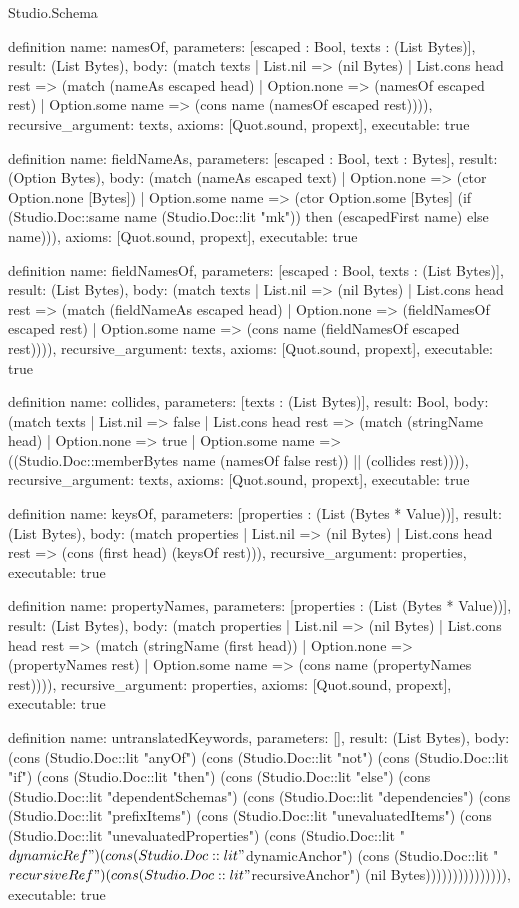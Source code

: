 \begin{lexlean}{Studio.Schema}
\begin{semanticmodule}
definition{
  name: namesOf,
  parameters: [escaped : Bool, texts : (List Bytes)],
  result: (List Bytes),
  body: (match texts
    | List.nil => (nil Bytes)
    | List.cons head rest => (match (nameAs escaped head)
      | Option.none => (namesOf escaped rest)
      | Option.some name => (cons name (namesOf escaped rest)))),
  recursive_argument: texts,
  axioms: [Quot.sound, propext],
  executable: true
}

definition{
  name: fieldNameAs,
  parameters: [escaped : Bool, text : Bytes],
  result: (Option Bytes),
  body: (match (nameAs escaped text)
    | Option.none => (ctor Option.none [Bytes])
    | Option.some name => (ctor Option.some [Bytes] (if (Studio.Doc::same name (Studio.Doc::lit "mk")) then (escapedFirst name) else name))),
  axioms: [Quot.sound, propext],
  executable: true
}

definition{
  name: fieldNamesOf,
  parameters: [escaped : Bool, texts : (List Bytes)],
  result: (List Bytes),
  body: (match texts
    | List.nil => (nil Bytes)
    | List.cons head rest => (match (fieldNameAs escaped head)
      | Option.none => (fieldNamesOf escaped rest)
      | Option.some name => (cons name (fieldNamesOf escaped rest)))),
  recursive_argument: texts,
  axioms: [Quot.sound, propext],
  executable: true
}

definition{
  name: collides,
  parameters: [texts : (List Bytes)],
  result: Bool,
  body: (match texts
    | List.nil => false
    | List.cons head rest => (match (stringName head)
      | Option.none => true
      | Option.some name => ((Studio.Doc::memberBytes name (namesOf false rest)) || (collides rest)))),
  recursive_argument: texts,
  axioms: [Quot.sound, propext],
  executable: true
}

definition{
  name: keysOf,
  parameters: [properties : (List (Bytes * Value))],
  result: (List Bytes),
  body: (match properties
    | List.nil => (nil Bytes)
    | List.cons head rest => (cons (first head) (keysOf rest))),
  recursive_argument: properties,
  executable: true
}

definition{
  name: propertyNames,
  parameters: [properties : (List (Bytes * Value))],
  result: (List Bytes),
  body: (match properties
    | List.nil => (nil Bytes)
    | List.cons head rest => (match (stringName (first head))
      | Option.none => (propertyNames rest)
      | Option.some name => (cons name (propertyNames rest)))),
  recursive_argument: properties,
  axioms: [Quot.sound, propext],
  executable: true
}

definition{
  name: untranslatedKeywords,
  parameters: [],
  result: (List Bytes),
  body: (cons (Studio.Doc::lit "anyOf") (cons (Studio.Doc::lit "not") (cons (Studio.Doc::lit "if") (cons (Studio.Doc::lit "then") (cons (Studio.Doc::lit "else") (cons (Studio.Doc::lit "dependentSchemas") (cons (Studio.Doc::lit "dependencies") (cons (Studio.Doc::lit "prefixItems") (cons (Studio.Doc::lit "unevaluatedItems") (cons (Studio.Doc::lit "unevaluatedProperties") (cons (Studio.Doc::lit "$dynamicRef") (cons (Studio.Doc::lit "$dynamicAnchor") (cons (Studio.Doc::lit "$recursiveRef") (cons (Studio.Doc::lit "$recursiveAnchor") (nil Bytes))))))))))))))),
  executable: true
}


\end{semanticmodule}
\end{lexlean}
